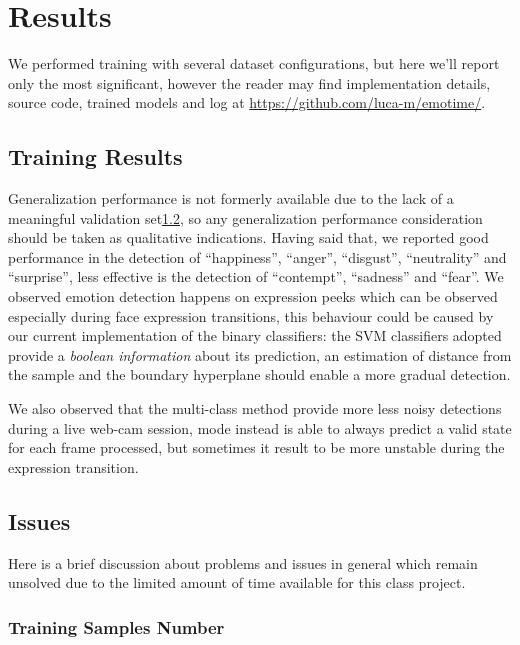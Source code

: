 \section{Results}

We performed training with several dataset configurations, but here we'll report only the most significant, however the reader may find implementation details, source code, trained models and log at \url{https://github.com/luca-m/emotime/}.

\subsection{Training Results}

Generalization performance is not formerly available due to the lack of a meaningful validation set\ref{res:issues}, so any generalization performance consideration should be taken as qualitative indications. Having said that, we reported good performance in the detection of ``happiness'', ``anger'', ``disgust'', ``neutrality'' and ``surprise'', less effective is the detection of ``contempt'', ``sadness'' and ``fear''. We observed emotion detection happens on expression peeks which can be observed especially during face expression transitions, this behaviour could be caused by our current implementation of the binary classifiers: the SVM classifiers adopted provide a \emph{boolean information} about its prediction, an estimation of distance from the sample and the boundary hyperplane should enable a more gradual detection.

We also observed that the  multi-class method provide more less noisy detections during a live web-cam session,  mode instead is able to always predict a valid state for each frame processed, but sometimes it result to be more unstable during the expression transition.

\subsection{Issues}
\label{res:issues}

Here is a brief discussion about problems and issues in general which remain unsolved due to the limited amount of time available for this class project.

\subsubsection*{Training Samples Number}

